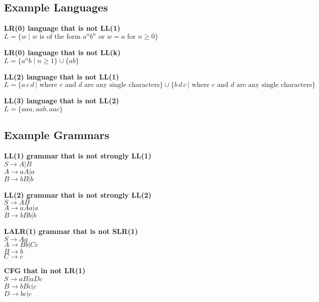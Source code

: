 \subsection{Example Languages}
\textbf{LR(0) language that is not LL(1)}\\
    $L = \{ w \mid w \text{ is of the form } a^n b^n \text{ or } w = a \text{ for } n \geq 0 \}$

\textbf{LR(0) language that is not LL(k)}\\
    $L = \{ a^n b \mid n \geq 1 \} \cup \{ ab \}$

\textbf{LL(2) language that is not LL(1)}\\
    $L = \{ a \, c \, d \, | \text{ where } c \text{ and } d \text{ are any single characters} \} \cup \{ b \, d \, c \, | \text{ where } c \text{ and } d \text{ are any single characters} \}$

\textbf{LL(3) language that is not LL(2)}\\
    $L = \{ aaa, aab, aac \}$


\subsection{Example Grammars}
\textbf{LL(1) grammar that is not strongly LL(1)}\\
    $S \rightarrow A | B$\\
    $A \rightarrow aA | a$\\
    $B \rightarrow bB | b$

\textbf{LL(2) grammar that is not strongly LL(2)}\\
    $S \rightarrow A B$\\
    $A \rightarrow a A a | a$\\
    $B \rightarrow b B b | b$

\textbf{LALR(1) grammar that is not SLR(1)}\\
    $S \rightarrow A a$\\
    $A \rightarrow B b | C c$\\
    $B \rightarrow b$\\
    $C \rightarrow c$

\textbf{CFG that in not LR(1)}\\
    $S\rightarrow aB|aDc$\\
    $B\rightarrow bBc|c$\\
    $D\rightarrow bc|c$